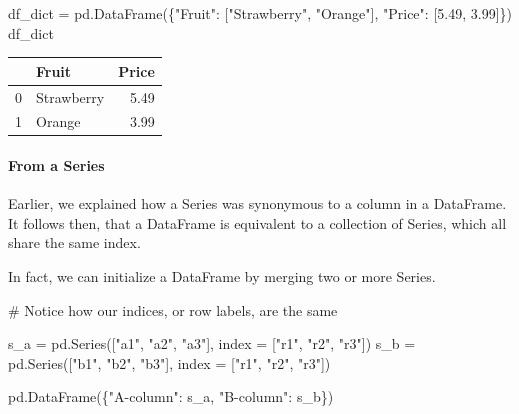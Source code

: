 \documentclass[
  letterpaper,
  DIV=11,
  numbers=noendperiod]{scrreprt}
\let\oldparagraph\paragraph
\renewcommand{\paragraph}[1]{\oldparagraph{#1}\mbox{}}
\newenvironment{Shaded}{\begin{snugshade}}{\end{snugshade}}
\newcommand{\CommentTok}[1]{\textcolor[rgb]{0.37,0.37,0.37}{#1}}
\newcommand{\FloatTok}[1]{\textcolor[rgb]{0.68,0.00,0.00}{#1}}
\newcommand{\NormalTok}[1]{\textcolor[rgb]{0.00,0.23,0.31}{#1}}
\newcommand{\OperatorTok}[1]{\textcolor[rgb]{0.37,0.37,0.37}{#1}}
\newcommand{\StringTok}[1]{\textcolor[rgb]{0.13,0.47,0.30}{#1}}
\begin{document}
\begin{Shaded}
\begin{Highlighting}[]
\NormalTok{df\_dict }\OperatorTok{=}\NormalTok{ pd.DataFrame(\{}\StringTok{"Fruit"}\NormalTok{: [}\StringTok{"Strawberry"}\NormalTok{, }\StringTok{"Orange"}\NormalTok{], }\StringTok{"Price"}\NormalTok{: [}\FloatTok{5.49}\NormalTok{, }\FloatTok{3.99}\NormalTok{]\})}
\NormalTok{df\_dict}
\end{Highlighting}
\end{Shaded}

\begin{tabular}{llr}
\toprule
{} &       Fruit &  Price \\
\midrule
0 &  Strawberry &   5.49 \\
1 &      Orange &   3.99 \\
\bottomrule
\end{tabular}

\hypertarget{from-a-series}{%
\paragraph{From a Series}\label{from-a-series}}

Earlier, we explained how a Series was synonymous to a column in a
DataFrame. It follows then, that a DataFrame is equivalent to a
collection of Series, which all share the same index.

In fact, we can initialize a DataFrame by merging two or more Series.

\begin{Shaded}
\begin{Highlighting}[]
\CommentTok{\# Notice how our indices, or row labels, are the same}

\NormalTok{s\_a }\OperatorTok{=}\NormalTok{ pd.Series([}\StringTok{"a1"}\NormalTok{, }\StringTok{"a2"}\NormalTok{, }\StringTok{"a3"}\NormalTok{], index }\OperatorTok{=}\NormalTok{ [}\StringTok{"r1"}\NormalTok{, }\StringTok{"r2"}\NormalTok{, }\StringTok{"r3"}\NormalTok{])}
\NormalTok{s\_b }\OperatorTok{=}\NormalTok{ pd.Series([}\StringTok{"b1"}\NormalTok{, }\StringTok{"b2"}\NormalTok{, }\StringTok{"b3"}\NormalTok{], index }\OperatorTok{=}\NormalTok{ [}\StringTok{"r1"}\NormalTok{, }\StringTok{"r2"}\NormalTok{, }\StringTok{"r3"}\NormalTok{])}

\NormalTok{pd.DataFrame(\{}\StringTok{"A{-}column"}\NormalTok{: s\_a, }\StringTok{"B{-}column"}\NormalTok{: s\_b\})}
\end{Highlighting}
\end{Shaded}
\end{document}
